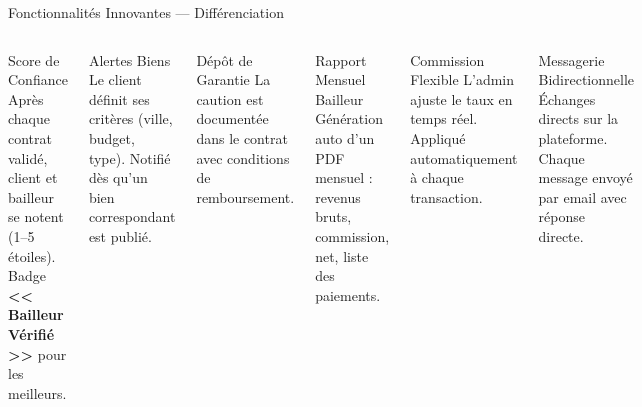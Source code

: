 ﻿\documentclass[aspectratio=169,10pt]{beamer}
\begin{document}
\begin{frame}{Fonctionnalit\'{e}s Innovantes --- Diff\'{e}renciation}
\begin{columns}[T]
\begin{block}{Score de Confiance}
Apr\`{e}s chaque contrat valid\'{e}, client et bailleur se notent (1--5 \'{e}toiles). Badge \textbf{<<\,Bailleur V\'{e}rifi\'{e}\,>>} pour les meilleurs.
\end{block}
\vspace{0.15cm}
\begin{block}{Alertes Biens}
Le client d\'{e}finit ses crit\`{e}res (ville, budget, type). Notifi\'{e} d\`{e}s qu'un bien correspondant est publi\'{e}.
\end{block}
\vspace{0.15cm}
\begin{block}{D\'{e}p\^{o}t de Garantie}
La caution est document\'{e}e dans le contrat avec conditions de remboursement.
\end{block}
\begin{block}{Rapport Mensuel Bailleur}
G\'{e}n\'{e}ration auto d'un PDF mensuel : revenus bruts, commission, net, liste des paiements.
\end{block}
\vspace{0.15cm}
\begin{block}{Commission Flexible}
L'admin ajuste le taux en temps r\'{e}el. Appliqu\'{e} automatiquement \`{a} chaque transaction.
\end{block}
\vspace{0.15cm}
\begin{alertblock}{Messagerie Bidirectionnelle}
\'{E}changes directs sur la plateforme. Chaque message envoy\'{e} par email avec r\'{e}ponse directe.
\end{alertblock}
\end{columns}
\end{frame}
\end{document}
